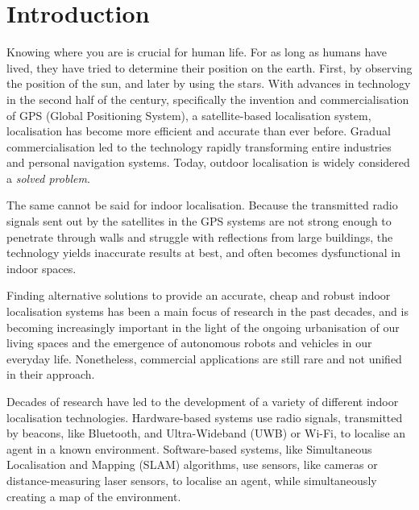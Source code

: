 \documentclass{article}
\begin{document}
  
  \newpage

  \tableofcontents
  \listoftables
  \listoffigures
  \newpage

  \begin{abstract} %
    \lipsum[1]
  \end{abstract}

  \section{Introduction}
  \label{sec:introduction}

  Knowing where you are is crucial for human life. For as long as humans have
  lived, they have tried to determine their position on the earth. First, by
  observing the position of the sun, and later by using the stars. With advances
  in technology in the second half of the  century, specifically the
  invention and commercialisation of GPS (Global Positioning System), a
  satellite-based localisation system, localisation has become more efficient
  and accurate than ever before. Gradual commercialisation led to the technology
  rapidly transforming entire industries and personal navigation systems. Today,
  outdoor localisation is widely considered a \textit{solved problem}.

  The same cannot be said for indoor localisation. Because the transmitted radio
  signals sent out by the satellites in the GPS systems are not strong enough to
  penetrate through walls and struggle with reflections from large buildings,
  the technology yields inaccurate results at best, and often becomes
  dysfunctional in indoor spaces.

  Finding alternative solutions to provide an accurate, cheap and robust indoor
  localisation systems has been a main focus of research in the past decades,
  and is becoming increasingly important in the light of the ongoing urbanisation
  of our living spaces and the emergence of autonomous robots and vehicles in
  our everyday life. Nonetheless, commercial applications are still rare and not
  unified in their approach.

  Decades of research have led to the development of a variety of different
  indoor localisation technologies. Hardware-based systems use radio signals,
  transmitted by beacons, like Bluetooth, and Ultra-Wideband
  (UWB) or Wi-Fi, to localise an agent in a known environment. Software-based
  systems, like Simultaneous Localisation and Mapping (SLAM) algorithms, use
  sensors, like cameras or distance-measuring laser sensors, to localise an
  agent, while simultaneously creating a map of the environment. 
\end{document}
